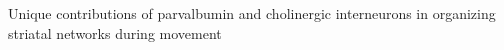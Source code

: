 Unique contributions of parvalbumin and cholinergic interneurons in organizing striatal networks during movement
